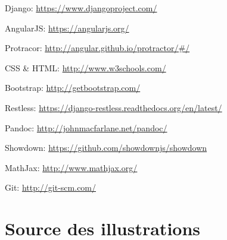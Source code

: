\documentclass[a4paper,10pt,twoside]{sphinxmanual}
\begin{document}
Django: \href{https://www.djangoproject.com/}{https://www.djangoproject.com/}

AngularJS: \href{https://angularjs.org/}{https://angularjs.org/}

Protracor: \href{http://angular.github.io/protractor/\#/}{http://angular.github.io/protractor/\#/}

CSS \& HTML: \href{http://www.w3schools.com/}{http://www.w3schools.com/}

Bootstrap: \href{http://getbootstrap.com/}{http://getbootstrap.com/}

Restless: \href{https://django-restless.readthedocs.org/en/latest/}{https://django-restless.readthedocs.org/en/latest/}

Pandoc: \href{http://johnmacfarlane.net/pandoc/}{http://johnmacfarlane.net/pandoc/}

Showdown: \href{https://github.com/showdownjs/showdown}{https://github.com/showdownjs/showdown}

MathJax: \href{http://www.mathjax.org/}{http://www.mathjax.org/}

Git: \href{http://git-scm.com/}{http://git-scm.com/}


\chapter{Source des illustrations}
\label{illustration:source-des-illustrations}\label{illustration::doc}\begingroup
\let\clearpage\relax
\renewcommand*\listfigurename{Tables}
\listoffigures
\endgroup


\renewcommand{\indexname}{Index}
\printindex
\end{document}
